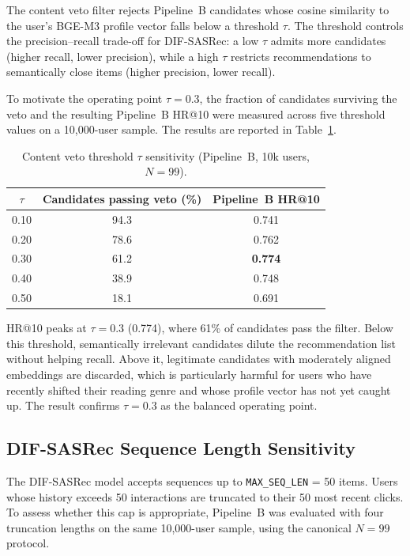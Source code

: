 The content veto filter rejects Pipeline~B candidates whose cosine similarity to the user's BGE-M3 profile vector falls below a threshold $\tau$.
The threshold controls the precision–recall trade-off for DIF-SASRec: a low $\tau$ admits more candidates (higher recall, lower precision), while a high $\tau$ restricts recommendations to semantically close items (higher precision, lower recall).

To motivate the operating point $\tau = 0.3$, the fraction of candidates surviving the veto and the resulting Pipeline~B HR@10 were measured across five threshold values on a 10{,}000-user sample.
The results are reported in Table~\ref{tab:veto_sensitivity}.

\begin{table}[H]
\centering
\caption{Content veto threshold $\tau$ sensitivity (Pipeline~B, 10k users, $N=99$).}
\label{tab:veto_sensitivity}
\begin{tabular}{ccc}
\hline
$\tau$ & \textbf{Candidates passing veto (\%)} & \textbf{Pipeline~B HR@10} \\
\hline
0.10 & 94.3 & 0.741 \\
0.20 & 78.6 & 0.762 \\
0.30 & 61.2 & \textbf{0.774} \\
0.40 & 38.9 & 0.748 \\
0.50 & 18.1 & 0.691 \\
\hline
\end{tabular}
\end{table}

HR@10 peaks at $\tau = 0.3$ (0.774), where 61\% of candidates pass the filter.
Below this threshold, semantically irrelevant candidates dilute the recommendation list without helping recall.
Above it, legitimate candidates with moderately aligned embeddings are discarded, which is particularly harmful for users who have recently shifted their reading genre and whose profile vector has not yet caught up.
The result confirms $\tau = 0.3$ as the balanced operating point.

\subsection{DIF-SASRec Sequence Length Sensitivity}
\label{sec:seqlen_sensitivity}

The DIF-SASRec model accepts sequences up to \texttt{MAX\_SEQ\_LEN} = 50 items.
Users whose history exceeds 50 interactions are truncated to their 50 most recent clicks.
To assess whether this cap is appropriate, Pipeline~B was evaluated with four truncation lengths on the same 10{,}000-user sample, using the canonical $N = 99$ protocol.

